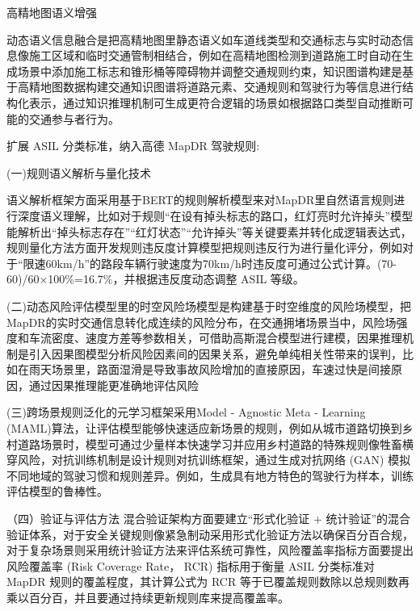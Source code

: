 高精地图语义增强

动态语义信息融合是把高精地图里静态语义如车道线类型和交通标志与实时动态信息像施工区域和临时交通管制相结合，例如在高精地图检测到道路施工时自动在生成场景中添加施工标志和锥形桶等障碍物并调整交通规则约束，知识图谱构建是基于高精地图数据构建交通知识图谱将道路元素、交通规则和驾驶行为等信息进行结构化表示，通过知识推理机制可生成更符合逻辑的场景如根据路口类型自动推断可能的交通参与者行为。


扩展 ASIL 分类标准，纳入高德 MapDR 驾驶规则:


(一)规则语义解析与量化技术

语义解析框架方面采用基于BERT的规则解析模型来对MapDR里自然语言规则进行深度语义理解，比如对于规则“在设有掉头标志的路口，红灯亮时允许掉头”模型能解析出“掉头标志存在”“红灯状态”“允许掉头”等关键要素并转化成逻辑表达式，规则量化方法方面开发规则违反度计算模型把规则违反行为进行量化评分，例如对于“限速60km/h”的路段车辆行驶速度为70km/h时违反度可通过公式计算。(70-60)/60×100\%=16.7\%，并根据违反度动态调整 ASIL 等级\cite{孟琳2016真实交通危险工况下驾驶员转向避撞相关因素分析}。


 (二)动态风险评估模型里的时空风险场模型是构建基于时空维度的风险场模型，把MapDR的实时交通信息转化成连续的风险分布，在交通拥堵场景当中，风险场强度和车流密度、速度方差等参数相关，可借助高斯混合模型进行建模，因果推理机制是引入因果图模型分析风险因素间的因果关系，避免单纯相关性带来的误判，比如在雨天场景里，路面湿滑是导致事故风险增加的直接原因，车速过快是间接原因，通过因果推理能更准确地评估风险 
 
 
 (三)跨场景规则泛化的元学习框架采用Model - Agnostic Meta - Learning (MAML)算法，让评估模型能够快速适应新场景的规则，例如从城市道路切换到乡村道路场景时，模型可通过少量样本快速学习并应用乡村道路的特殊规则像牲畜横穿风险，对抗训练机制是设计规则对抗训练框架，通过生成对抗网络 (GAN) 模拟不同地域的驾驶习惯和规则差异。例如，生成具有地方特色的驾驶行为样本，训练评估模型的鲁棒性。
 
 
（四）验证与评估方法
混合验证架构方面要建立“形式化验证 + 统计验证”的混合验证体系，对于安全关键规则像紧急制动采用形式化验证方法以确保百分百合规，对于复杂场景则采用统计验证方法来评估系统可靠性，风险覆盖率指标方面要提出风险覆盖率 (Risk Coverage Rate， RCR) 指标用于衡量 ASIL 分类标准对 MapDR 规则的覆盖程度，其计算公式为 RCR 等于已覆盖规则数除以总规则数再乘以百分百，并且要通过持续更新规则库来提高覆盖率。

\newpage


